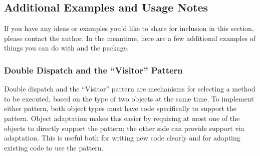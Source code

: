 \begin{verbatim%
}
\begin{verbatim%
}
\begin{verbatim%
}
\begin{verbatim%
}
\begin{verbatim%
}
\begin{verbatim%
}
\begin{verbatim%
}
\begin{verbatim%
}
\begin{verbatim%
}
\begin{verbatim%
}
\begin{verbatim%
}
\begin{verbatim%
}
\begin{seealso}


\end{seealso}














\newpage
\subsection{Additional Examples and Usage Notes}

If you have any ideas or examples you'd like to share for inclusion in this
section, please contact the author.  In the meantime, here are a few additional
examples of things you can do with  and the 
package.


\subsubsection{Double Dispatch and the ``Visitor'' Pattern\label{dispatch-example}}

Double dispatch and the ``Visitor'' pattern are mechanisms for selecting a
method to be executed, based on the type of two objects at the same time.
To implement either pattern, both object types must have code specifically to
support the pattern.  Object adaptation makes this easier by requiring at most
one of the objects to directly support the pattern; the other side can provide
support via adaptation.  This is useful both for writing new code clearly and
for adapting existing code to use the pattern.


\end{verbatim%
}
\end{verbatim%
}
\end{verbatim%
}
\end{verbatim%
}
\end{verbatim%
}
\end{verbatim%
}
\end{verbatim%
}
\end{verbatim%
}
\end{verbatim%
}
\end{verbatim%
}
\end{verbatim%
}
\end{verbatim%
}
